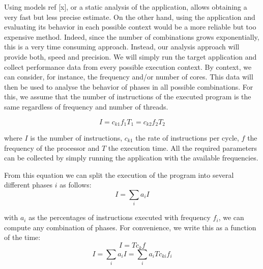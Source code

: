 Using models ref [x], or a static analysis of the application, allows obtaining a very fast but less precise estimate. On the other hand, using the application and evaluating its behavior in each possible context would be a more reliable but too expensive method. Indeed, since the number of combinations grows exponentially, this is a very time consuming approach. Instead, our analysis approach will provide both, speed and precision. We will simply run the target application and collect performance data from every possible execution context. By context, we can consider, for instance, the frequency and/or number of cores. This data will then be used to analyse the behavior of phases in all possible combinations. For this, we assume that the number of instructions of the executed program is the same regardless of frequency and number of threads.

\begin{equation}
    I=c_{k1}f_1T_1=c_{k2}f_2T_2
\end{equation}

where $I$ is the number of instructions, $c_{k1}$ the rate of instructions per cycle, $f$ the frequency of the processor and $T$ the execution time. All the required parameters can be collected by simply running the application with the available frequencies. 

From this equation we can split the execution of the program into several different phases $i$ as follows:
\begin{equation}
    I=\sum_{i}{a_iI} %
\end{equation}

with $a_i$ as the percentages of instructions executed with frequency $f_i$, we can compute any combination of phases. For convenience, we write this as a function of the time:
\begin{equation}
I=Tc_{k}f
\end{equation}
\begin{equation}
    I=\sum_{i}{a_iI}=\sum_i{a_iTc_{ki}f_i}
\end{equation}

